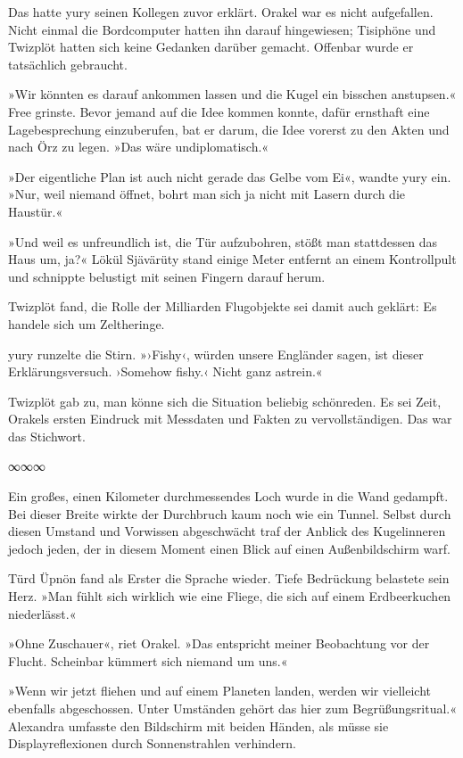 Das hatte yury seinen Kollegen zuvor erklärt. Orakel war es nicht aufgefallen. Nicht einmal die Bordcomputer hatten ihn darauf hingewiesen; Tisiphöne und Twizplöt hatten sich keine Gedanken darüber gemacht. Offenbar wurde er tatsächlich gebraucht.

»Wir könnten es darauf ankommen lassen und die Kugel ein bisschen anstupsen.« Free grinste. Bevor jemand auf die Idee kommen konnte, dafür ernsthaft eine Lagebesprechung einzuberufen, bat er darum, die Idee vorerst zu den Akten und nach Örz zu legen. »Das wäre undiplomatisch.«

»Der eigentliche Plan ist auch nicht gerade das Gelbe vom Ei«, wandte yury ein. »Nur, weil niemand öffnet, bohrt man sich ja nicht mit Lasern durch die Haustür.«

»Und weil es unfreundlich ist, die Tür aufzubohren, stößt man stattdessen das Haus um, ja?« Lökül Sjävärüty stand einige Meter entfernt an einem Kontrollpult und schnippte belustigt mit seinen Fingern darauf herum.

Twizplöt fand, die Rolle der Milliarden Flugobjekte sei damit auch geklärt: Es handele sich um Zeltheringe.

yury runzelte die Stirn. »›Fishy‹, würden unsere Engländer sagen, ist dieser Erklärungsversuch. ›Somehow fishy.‹ Nicht ganz astrein.«

Twizplöt gab zu, man könne sich die Situation beliebig schönreden. Es sei Zeit, Orakels ersten Eindruck mit Messdaten und Fakten zu vervollständigen. Das war das Stichwort.

\begin{center}
∞∞∞
\end{center}

Ein großes, einen Kilometer durchmessendes Loch wurde in die Wand gedampft. Bei dieser Breite wirkte der Durchbruch kaum noch wie ein Tunnel. Selbst durch diesen Umstand und Vorwissen abgeschwächt traf der Anblick des Kugelinneren jedoch jeden, der in diesem Moment einen Blick auf einen Außenbildschirm warf.

Türd Üpnön fand als Erster die Sprache wieder. Tiefe Bedrückung belastete sein Herz. »Man fühlt sich wirklich wie eine Fliege, die sich auf einem Erdbeerkuchen niederlässt.«

»Ohne Zuschauer«, riet Orakel. »Das entspricht meiner Beobachtung vor der Flucht. Scheinbar kümmert sich niemand um uns.«

»Wenn wir jetzt fliehen und auf einem Planeten landen, werden wir vielleicht ebenfalls abgeschossen. Unter Umständen gehört das hier zum Begrüßungsritual.« Alexandra umfasste den Bildschirm mit beiden Händen, als müsse sie Displayreflexionen durch Sonnenstrahlen verhindern.

